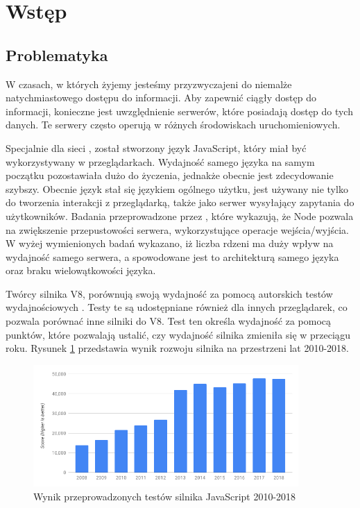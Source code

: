 \section{Wstęp}

\subsection{Problematyka}
W czasach, w których żyjemy jesteśmy przyzwyczajeni do niemalże natychmiastowego dostępu do informacji. Aby zapewnić ciągły dostęp do informacji, konieczne jest uwzględnienie serwerów, które posiadają dostęp do tych danych. Te serwery często operują w różnych środowiskach uruchomieniowych.

Specjalnie dla sieci , został stworzony język JavaScript, który miał być wykorzystywany w przeglądarkach. Wydajność samego języka na samym początku pozostawiała dużo do życzenia, jednakże obecnie jest zdecydowanie szybszy. Obecnie język stał się językiem ogólnego użytku, jest używany nie tylko do tworzenia interakcji z przeglądarką, także jako serwer wysyłający zapytania  do użytkowników. Badania przeprowadzone przez \cite{comparison_of_servers}, które wykazują, że Node pozwala na zwiększenie przepustowości serwera, wykorzystujące operacje wejścia/wyjścia. W wyżej wymienionych badań wykazano, iż liczba rdzeni ma duży wpływ na wydajność samego serwera, a spowodowane jest to architekturą samego języka oraz braku wielowątkowości języka. 

Twórcy silnika V8, porównują swoją wydajność za pomocą autorskich testów wydajnościowych \cite{ten_years_of_v8_chromium} \cite{ten_years_of_v8}. Testy te są udostępniane również dla innych przeglądarek, co pozwala porównać inne silniki do V8. Test ten określa wydajność za pomocą punktów, które pozwalają ustalić, czy wydajność silnika zmieniła się w przeciągu roku. Rysunek \ref{fig:performance_v8} przedstawia wynik rozwoju silnika na przestrzeni lat 2010-2018.

\begin{figure}[h]
  \centering
  \includegraphics[width=0.9\textwidth]{Figures/v8_bench_2010_2018.png}
  \caption{Wynik przeprowadzonych testów silnika JavaScript 2010-2018 \cite{ten_years_of_v8_chromium}}
  \label{fig:performance_v8}
\end{figure}


